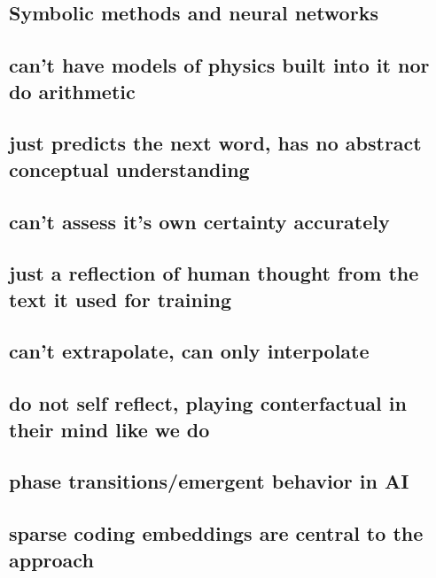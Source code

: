 \subsection{Symbolic methods and neural networks} %

\subsection{can't have models of physics built into it nor do arithmetic} %

\subsection{just predicts the next word, has no abstract conceptual understanding} %


\subsection{can't assess it's own certainty accurately} %

\subsection{just a reflection of human thought from the text it used for training} %

\subsection{can't extrapolate, can only interpolate} %

\subsection{do not self reflect, playing conterfactual in their mind like we do} %

\subsection{phase transitions/emergent behavior in AI} %

\subsection{sparse coding embeddings are central to the approach} %


